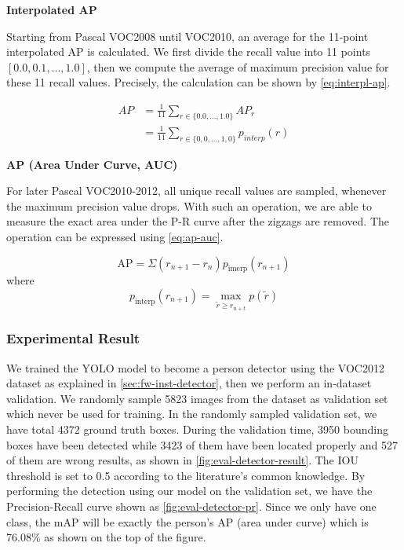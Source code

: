 \noindent \textbf{Interpolated AP}

\noindent Starting from Pascal VOC2008 until VOC2010, an average for the 11-point
interpolated AP is calculated. We first divide the recall value into 11 points
$[0.0, 0.1, ..., 1.0]$, then we compute the average of maximum precision value
for these 11 recall values. Precisely, the calculation can be shown by
\autoref{eq:interpl-ap}.

\begin{equation}
\label{eq:interpl-ap}
\begin{aligned} A P &=\frac{1}{11} \sum_{r \in\{0.0, \ldots, 1.0\}} A P_{r} \\
&=\frac{1}{11} \sum_{r \in\{0,0, \ldots, 1,0\}} p_{i n t e r p}(r) \end{aligned}
\end{equation}

\noindent \textbf{AP (Area Under Curve, AUC)}

\noindent For later Pascal VOC2010-2012, all unique recall values are sampled,
whenever the maximum precision value drops. With such an operation, we are able to
measure the exact area under the P-R curve after the zigzags are removed. The
operation can be expressed using \autoref{eq:ap-auc}.

\begin{equation}
\label{eq:ap-auc}
\mathrm{AP}=\Sigma\left(r_{n+1}-r_{n}\right) p_{\text
    {imerp}}\left(r_{n+1}\right)
\end{equation}
\noindent where
$$
p_{\text {interp}}
\left(r_{n+1}
\right)=\max _{\tilde{r} \geq r_{n+t}} p(\widetilde{r})
$$

\subsubsection{Experimental Result}
\label{sec:Eval-detection-result}

We trained the YOLO model to become a person detector using the VOC2012 dataset
as explained in \autoref{sec:fw-inst-detector}, then we perform an in-dataset
validation. We randomly sample 5823 images from the dataset as validation set
which never be used for training.
In the randomly sampled validation set, we have total 4372
ground truth boxes. During the validation time, 3950 bounding boxes have been
detected while 3423 of them have been located properly and 527 of them are
wrong results, as shown in \autoref{fig:eval-detector-result}. The IOU threshold is
set to 0.5 according to the literature's common knowledge.
By performing the detection using our model on the validation set, we have the
Precision-Recall curve shown as \autoref{fig:eval-detector-pr}. Since we only
have one class, the mAP will be exactly the person's AP (area under curve)
which is 76.08\% as shown on the top of the figure.

